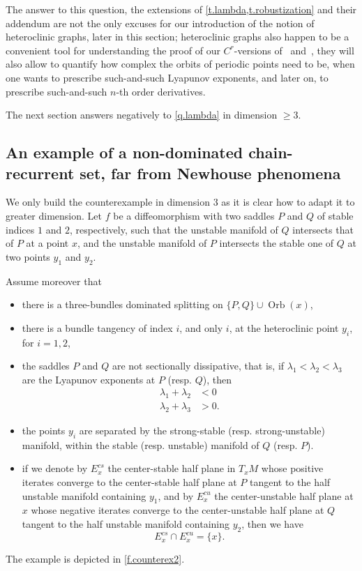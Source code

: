 \documentclass[11pt, a4paper]{amsart}
\theoremstyle{plain}
\theoremstyle{definition}
\theoremstyle{remark}
\numberwithin{equation}{section}         %
\def\Orb{\operatorname{Orb}}
\begin{document}
The answer to this question, the extensions of \cref{t.lambda,t.robustization} and their addendum are not the only excuses for our introduction of the notion of heteroclinic graphs, later in this section; heteroclinic graphs also happen to be a convenient tool for understanding the proof of our $C^r$-versions of~\cite{BDP} and~\cite{BB}, they will also allow to quantify how complex the orbits of periodic points need to be, when one wants to prescribe such-and-such Lyapunov exponents, and later on, to prescribe such-and-such $n$-th order derivatives.

The next section answers negatively to \cref{q.lambda} in dimension $\geq 3$.

\subsection{An example of a non-dominated chain-recurrent set, far from Newhouse phenomena}\label{s.counterex}
We only build the counterexample in dimension $3$ as it is clear how to adapt it to greater dimension. Let $f$ be a diffeomorphism with two saddles $P$ and $Q$ of stable indices $1$ and $2$, respectively, such that the unstable manifold of $Q$ intersects that of $P$ at a point $x$, and the unstable manifold of $P$ intersects the stable one of $Q$ at two points $y_1$ and $y_2$. 

Assume moreover that 
\begin{itemize}
\item there is a three-bundles dominated splitting on $\{P,Q\}\cup \Orb(x)$,
\item there is a bundle tangency of index $i$, and only $i$, at the heteroclinic point $y_i$, for $i=1,2$,
\item the saddles $P$ and $Q$ are not sectionally dissipative, that is, if $\lambda_1<\lambda_2<\lambda_3$ are the Lyapunov exponents at $P$ (resp. $Q$), then
\begin{align*}
\lambda_1+\lambda_2&<0\\
\lambda_2+\lambda_3&>0.
\end{align*}
\item the points $y_i$ are separated by the strong-stable (resp. strong-unstable) manifold, within the stable (resp. unstable) manifold of $Q$ (resp. $P$).
\item if we denote by $E^{cs}_x$ the center-stable half plane in $T_xM$ whose positive iterates converge to the center-stable half plane at $P$ tangent to the half unstable manifold containing $y_1$, and by  $E^{cu}_x$ the center-unstable half plane at $x$ whose negative iterates converge to the center-unstable half plane at $Q$ tangent to the half unstable manifold containing $y_2$, then we have
$$E^{cs}_x\cap E^{cu}_x=\{x\}.$$
\end{itemize}
The example is depicted in  \cref{f.counterex2}.
\end{document}
